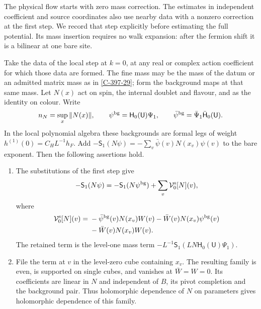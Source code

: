 \documentclass[11pt,letterpaper,reqno]{amsart}
\makeatletter
\theoremstyle{definition}
\newcommand{\ms@minorstart}{%
  \pushQED{\qed}\renewcommand{\qedsymbol}{$\blacksquare$}}
\newenvironment{lemma}[1][]{\ms@minorstart\ms@lemma[#1]}
  {\popQED\endms@lemma}
\theoremstyle{remark}
\makeatother
\begin{document}
The physical flow starts with zero mass correction.  The estimates in
independent coefficient and source coordinates also use nearby data
with a nonzero correction at the first step.  We record that step
explicitly before estimating the full potential.  Its mass insertion
requires no walk expansion: after the fermion shift it is a bilinear
at one bare site.

\begin{lemma}[The mass insertion at the first step]\label{C-388-40}
Take the data of the local step at $k=0$, at any real or complex
action coefficient for which those data are formed.  The fine mass
may be the mass of the datum or an admitted matrix mass as in
\cref{C-397-29}; form the background maps at that same mass.
Let $N(x)$ act on spin, the internal doublet and flavour, and as the
identity on colour.  Write
\[
 n_N=\sup_x\|N(x)\|,\qquad
 \psi^{\rm bg}=\mathsf H_0(\mathsf U)\Psi_1,\qquad
 \bar\psi^{\rm bg}=\bar\Psi_1\bar{\mathsf H}_0(\mathsf U).
\]
In the local polynomial algebra these backgrounds are formal legs
of weight $h^{(1)}(0)=C_HL^{-1}h_F$.  Add
$-\mathsf S_1(N\psi)=-\sum_v\bar\psi(v)N(x_v)\psi(v)$ to the
bare exponent.  Then the following assertions hold.
\begin{enumerate}
\item[(i)]
The substitutions of the first step give
\begin{equation}\label{eq:qcd-first-mass-split}
 -\mathsf S_1(N\psi)
 =-\mathsf S_1(N\psi^{\rm bg})
       +\sum_v\mathcal V^{\rm s}_0[N](v),
\end{equation}
where
\begin{equation}\label{eq:qcd-first-mass-vertex}
 \begin{split}
 \mathcal V^{\rm s}_0[N](v)={}&
 -\bar\psi^{\rm bg}(v)N(x_v)W(v)
 -\bar W(v)N(x_v)\psi^{\rm bg}(v)\\
 &-\bar W(v)N(x_v)W(v).
 \end{split}
\end{equation}
The retained term is the level-one mass term
$-L^{-1}\mathsf S_1(LN\mathsf H_0(\mathsf U)\Psi_1)$.

\item[(ii)]
File the term at $v$ in the level-zero cube containing $x_v$.
The resulting family is even, is supported on single cubes, and
vanishes at $\bar W=W=0$.  Its coefficients are linear in $N$ and
independent of $B$, its pivot completion and the background pair.
Thus holomorphic dependence of $N$ on parameters gives holomorphic
dependence of this family.


\end{enumerate}
\end{lemma}
\end{document}
